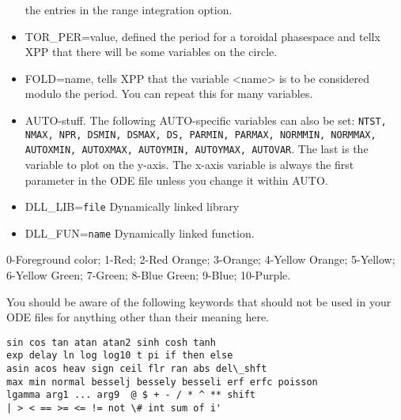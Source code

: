 \begin{itemize}
the entries in the range integration option.
\item TOR\_PER=value, defined the period for a toroidal phasespace and
tellx XPP that there will be some variables on the circle.
\item FOLD=name, tells XPP that the variable <name> is to be
considered modulo the period.  You can repeat this for many variables.
\item AUTO-stuff. The following AUTO-specific variables can also be
set: {\tt NTST, NMAX, NPR, DSMIN, DSMAX, DS, PARMIN, PARMAX, NORMMIN,
NORMMAX, AUTOXMIN, AUTOXMAX, AUTOYMIN, AUTOYMAX, AUTOVAR}.  The last
is the variable to plot on the y-axis. The x-axis variable is always
the first parameter in the ODE file unless you change it within AUTO. 
\item DLL\_LIB={\tt file} Dynamically linked library
\item  DLL\_FUN={\tt name} Dynamically linked function.
\end{itemize}

\bigskip 
{} 0-Foreground color; 1-Red; 2-Red Orange; 3-Orange;
4-Yellow Orange; 5-Yellow; 6-Yellow Green; 7-Green; 8-Blue Green; 9-Blue;
10-Purple.

\bigskip
{}
You should be aware of the following
keywords that should not be used in your ODE files for anything other
than their meaning here.
\begin{verbatim}
sin cos tan atan atan2 sinh cosh tanh
exp delay ln log log10 t pi if then else
asin acos heav sign ceil flr ran abs del\_shft 
max min normal besselj bessely besseli erf erfc poisson
lgamma arg1 ... arg9  @ $ + - / * ^ ** shift
| > < == >= <= != not \# int sum of i'
\end{verbatim}




